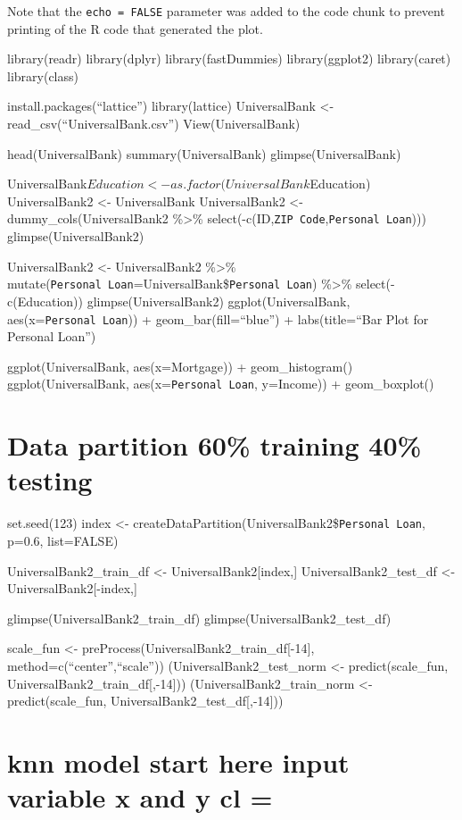\documentclass[
]{article}
\begin{document}
Note that the \texttt{echo\ =\ FALSE} parameter was added to the code
chunk to prevent printing of the R code that generated the plot.

library(readr) library(dplyr) library(fastDummies) library(ggplot2)
library(caret) library(class)

install.packages(``lattice'') library(lattice) UniversalBank \textless-
read\_csv(``UniversalBank.csv'') View(UniversalBank)

head(UniversalBank) summary(UniversalBank) glimpse(UniversalBank)

UniversalBank\(Education <- as.factor(UniversalBank\)Education)
UniversalBank2 \textless- UniversalBank UniversalBank2 \textless-
dummy\_cols(UniversalBank2 \%\textgreater\%
select(-c(ID,\texttt{ZIP\ Code},\texttt{Personal\ Loan})))
glimpse(UniversalBank2)

UniversalBank2 \textless- UniversalBank2 \%\textgreater\%
mutate(\texttt{Personal\ Loan}=UniversalBank\$\texttt{Personal\ Loan})
\%\textgreater\% select(-c(Education)) glimpse(UniversalBank2)
ggplot(UniversalBank, aes(x=\texttt{Personal\ Loan})) +
geom\_bar(fill=``blue'') + labs(title=``Bar Plot for Personal Loan'')

ggplot(UniversalBank, aes(x=Mortgage)) + geom\_histogram()
ggplot(UniversalBank, aes(x=\texttt{Personal\ Loan}, y=Income)) +
geom\_boxplot()

\hypertarget{data-partition-60-training-40-testing}{%
\section{Data partition 60\% training 40\%
testing}\label{data-partition-60-training-40-testing}}

set.seed(123) index \textless-
createDataPartition(UniversalBank2\$\texttt{Personal\ Loan}, p=0.6,
list=FALSE)

UniversalBank2\_train\_df \textless- UniversalBank2{[}index,{]}
UniversalBank2\_test\_df \textless- UniversalBank2{[}-index,{]}

glimpse(UniversalBank2\_train\_df) glimpse(UniversalBank2\_test\_df)

scale\_fun \textless- preProcess(UniversalBank2\_train\_df{[}-14{]},
method=c(``center'',``scale'')) (UniversalBank2\_test\_norm \textless-
predict(scale\_fun, UniversalBank2\_train\_df{[},-14{]}))
(UniversalBank2\_train\_norm \textless- predict(scale\_fun,
UniversalBank2\_test\_df{[},-14{]}))

\hypertarget{knn-model-start-here-input-variable-x-and-y-cl}{%
\section{knn model start here input variable x and y cl
=}\label{knn-model-start-here-input-variable-x-and-y-cl}}
\end{document}
